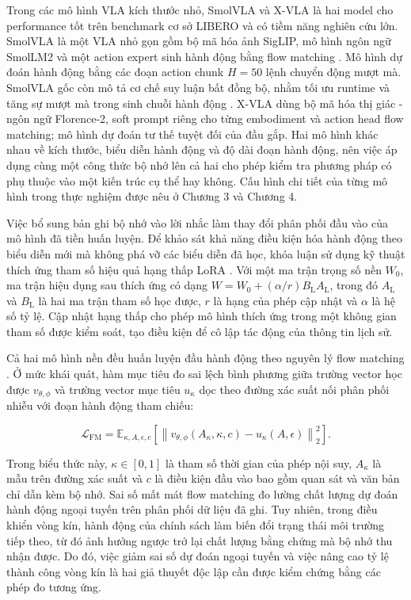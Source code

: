 Trong các mô hình VLA kích thước nhỏ, SmolVLA và X-VLA là hai model cho performance tốt trên benchmark cơ sở LIBERO và có tiềm năng nghiên cứu lớn. SmolVLA \cite{smolvla2025} là một VLA nhỏ gọn gồm bộ mã hóa ảnh SigLIP, mô hình ngôn ngữ SmolLM2 và một action expert sinh hành động bằng flow matching \cite{flowmatching2023}. Mô hình dự đoán hành động bằng các đoạn action chunk $H=50$ lệnh chuyển động mượt mà. SmolVLA gốc còn mô tả cơ chế suy luận bất đồng bộ, nhằm tối ưu runtime và tăng sự mượt mà trong sinh chuỗi hành động \cite{smolvla2025,smolvlaCheckpoint}. X-VLA \cite{xvla2025} dùng bộ mã hóa thị giác - ngôn ngữ Florence-2, soft prompt riêng cho từng embodiment và action head flow matching; mô hình dự đoán tư thế tuyệt đối của đầu gắp. Hai mô hình khác nhau về kích thước, biểu diễn hành động và độ dài đoạn hành động, nên việc áp dụng cùng một công thức bộ nhớ lên cả hai cho phép kiểm tra phương pháp có phụ thuộc vào một kiến trúc cụ thể hay không. Cấu hình chi tiết của từng mô hình trong thực nghiệm được nêu ở Chương 3 và Chương 4.

Việc bổ sung bản ghi bộ nhớ vào lời nhắc làm thay đổi phân phối đầu vào của mô hình đã tiền huấn luyện. Để khảo sát khả năng điều kiện hóa hành động theo biểu diễn mới mà không phá vỡ các biểu diễn đã học, khóa luận sử dụng kỹ thuật thích ứng tham số hiệu quả hạng thấp LoRA \cite{lora2021}. Với một ma trận trọng số nền $W_0$, ma trận hiệu dụng sau thích ứng có dạng $W = W_0 + (\alpha/r)B_{\mathrm{L}}A_{\mathrm{L}}$, trong đó $A_{\mathrm{L}}$ và $B_{\mathrm{L}}$ là hai ma trận tham số học được, $r$ là hạng của phép cập nhật và $\alpha$ là hệ số tỷ lệ. Cập nhật hạng thấp cho phép mô hình thích ứng trong một không gian tham số được kiểm soát, tạo điều kiện để cô lập tác động của thông tin lịch sử.

Cả hai mô hình nền đều huấn luyện đầu hành động theo nguyên lý flow matching \cite{flowmatching2023,smolvla2025,xvla2025}. Ở mức khái quát, hàm mục tiêu đo sai lệch bình phương giữa trường vector học được $v_{\theta,\phi}$ và trường vector mục tiêu $u_\kappa$ dọc theo đường xác suất nối phân phối nhiễu với đoạn hành động tham chiếu:

\begin{equation}
\mathcal L_{\mathrm{FM}}
= \mathbb E_{\kappa,A,\epsilon,c}\!
\left[\left\|v_{\theta,\phi}(A_\kappa,\kappa,c)-u_\kappa(A,\epsilon)\right\|_2^2\right].
\end{equation}

Trong biểu thức này, $\kappa \in [0, 1]$ là tham số thời gian của phép nội suy, $A_\kappa$ là mẫu trên đường xác suất và $c$ là điều kiện đầu vào bao gồm quan sát và văn bản chỉ dẫn kèm bộ nhớ. Sai số mất mát flow matching đo lường chất lượng dự đoán hành động ngoại tuyến trên phân phối dữ liệu đã ghi. Tuy nhiên, trong điều khiển vòng kín, hành động của chính sách làm biến đổi trạng thái môi trường tiếp theo, từ đó ảnh hưởng ngược trở lại chất lượng bằng chứng mà bộ nhớ thu nhận được. Do đó, việc giảm sai số dự đoán ngoại tuyến và việc nâng cao tỷ lệ thành công vòng kín là hai giả thuyết độc lập cần được kiểm chứng bằng các phép đo tương ứng.

